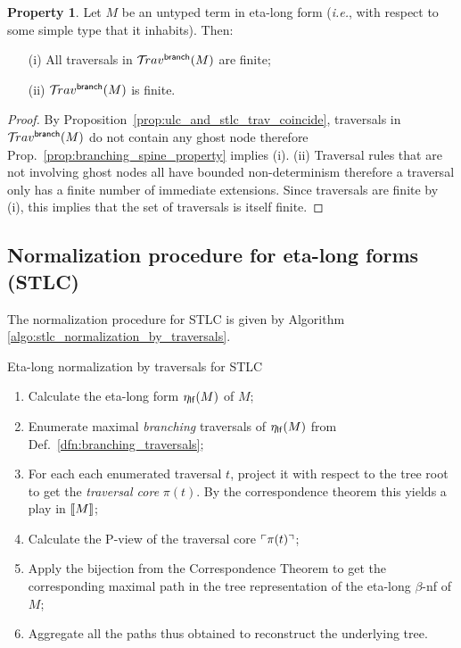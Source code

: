 \documentclass{article}
\makeatletter
\theoremstyle{definition}
\newtheorem{property}{Property}[section]
\newcommand{\branching}{{\sf branch}}
\newcommand{\travsetbr}{{\travset^\branching}}
\def\coresymbol{\pi} %
\newcommand{\core}[1]{\coresymbol(#1)} %
\renewcommand\ie{{\it i.e.\@\xspace}}
\makeatother
\begin{document}
\begin{property}
\label{prop:etalong_trav_finite}
Let $M$ be an untyped term in eta-long form (\ie, with respect to some simple type that it inhabits).
Then:
\begin{enumerate}
\item[(i)] All traversals in $\travsetbr(M)$ are finite;
\item[(ii)] $\travsetbr(M)$ is finite.
\end{enumerate}
\end{property}
\begin{proof}
By Proposition~\ref{prop:ulc_and_stlc_trav_coincide}, traversals in $\travsetbr(M)$ do not contain any ghost node therefore Prop.~\ref{prop:branching_spine_property} implies (i).
(ii) Traversal rules that are not involving ghost nodes all have bounded non-determinism therefore a traversal only has a finite number of immediate extensions. Since traversals are finite by (i), this implies that the set of traversals is itself finite.
\end{proof}


\subsection{Normalization procedure for eta-long forms (STLC)}

The normalization procedure for STLC is given by Algorithm \ref{algo:stlc_normalization_by_traversals}.

\begin{algorithm}[!ht]
\caption{Eta-long normalization by traversals for STLC}
\label{algo:stlc_normalization_by_traversals}
\begin{algorithmic}
\begin{enumerate}
  \item Calculate the eta-long form $\eta_{\sf lf}(M)$ of $M$;
  \item Enumerate maximal \emph{branching} traversals of $\eta_{\sf lf}(M)$ from Def.~\ref{dfn:branching_traversals};
  \item For each each enumerated traversal $t$, project it with respect to the tree root to get the \emph{traversal core} $\core{t}$. By the correspondence theorem this yields a play in ${[\![ M ]\!]}$;
  \item Calculate the P-view of the traversal core $\pview{\core{t}}$;
  \item Apply the bijection from the Correspondence Theorem to get the corresponding maximal path in the tree representation of the eta-long $\beta$-nf of $M$;
  \item Aggregate all the paths thus obtained to reconstruct the underlying tree.
\end{enumerate}
\end{algorithmic}
\end{algorithm}
\end{document}
